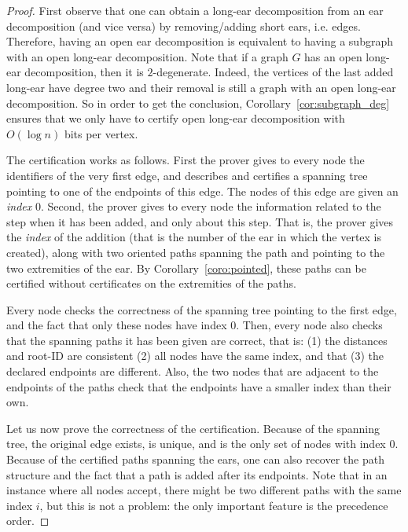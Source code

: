 \documentclass[a4paper,thm-restate,USenglish]{lipics-v2019}
\begin{document}
\begin{proof}
First observe that one can obtain a long-ear decomposition from an ear decomposition (and vice versa) by removing/adding short ears, i.e. edges. Therefore, having an open ear decomposition is equivalent to having a subgraph with an open long-ear decomposition. Note that if a graph $G$ has an open long-ear decomposition, then it is $2$-degenerate. Indeed, the vertices of the last added long-ear have degree two and their removal is still a graph with an open long-ear decomposition. So in order to get the conclusion, Corollary~\ref{cor:subgraph_deg} ensures that we only have to certify open long-ear decomposition with $O(\log n)$ bits per vertex. 


The certification works as follows. 
First the prover gives to every node the identifiers of the very first edge, and describes and certifies a spanning tree pointing to one of the endpoints of this edge.
The nodes of this edge are given an \emph{index} 0.
Second, the prover gives to every node the information related to the step when it has been added, and only about this step. 
That is, the prover gives the \emph{index} of the addition (that is the number of the ear in which the vertex is created), along with two oriented paths spanning the path and pointing to the two extremities of the ear. 
By Corollary~\ref{coro:pointed}, these paths can be certified without certificates on the extremities of the paths.

Every node checks the correctness of the spanning tree pointing to the first edge, and the fact that only these nodes have index 0.
Then, every node also checks that the spanning paths it has been given are correct, that is: (1) the distances and root-ID are consistent (2) all nodes have the same index, and that (3) the declared endpoints are different.
Also, the two nodes that are adjacent to the endpoints of the paths check that the endpoints have a smaller index than their own.

Let us now prove the correctness of the certification.
Because of the spanning tree, the original edge exists, is unique, and is the only set of nodes with index 0. Because of the certified paths spanning the ears, one can also recover the path structure and the fact that a path is added after its endpoints. 
Note that in an instance where all nodes accept, there might be two different paths with the same index $i$, but this is not a problem: the only important feature is the precedence order.
\end{proof}
\end{document}
